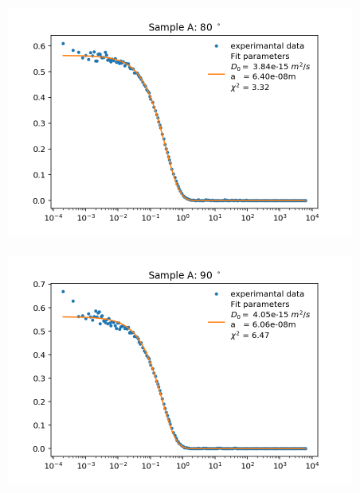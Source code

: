 \documentclass[]{article}
\begin{document}
\begin{figure}[!h]
\centering

\medskip
\begin{subfigure}{0.48\textwidth}
\includegraphics[width=\linewidth]{Plots/A/80.png}
\end{subfigure}
\begin{subfigure}[c]{0.48\linewidth}
\includegraphics[width=\linewidth]{Plots/A/90.png}
\end{subfigure}


\end{figure}
\end{document}
